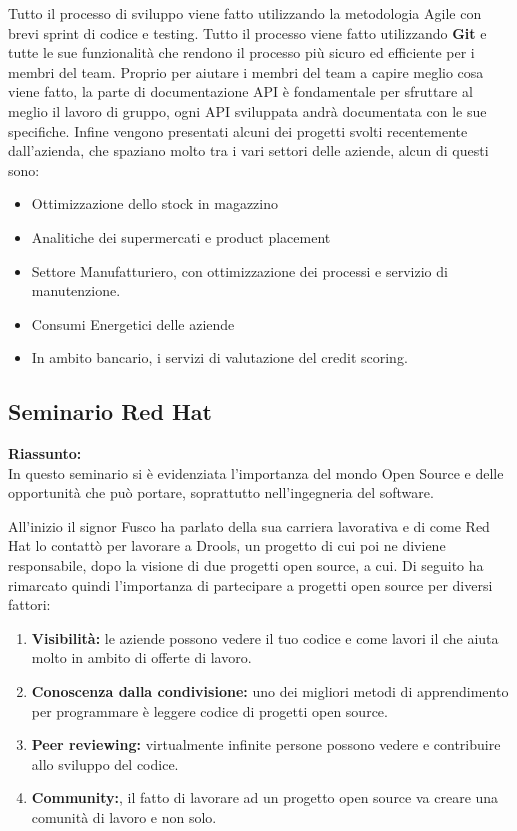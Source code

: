 \documentclass{article}
\begin{document}
Tutto il processo di sviluppo viene fatto utilizzando la metodologia Agile con brevi sprint di codice e testing.
Tutto il processo viene fatto utilizzando \textbf{Git} e tutte le sue funzionalità che rendono il processo più sicuro ed efficiente per i membri del team.
Proprio per aiutare i membri del team a capire meglio cosa viene fatto, la parte di documentazione API è fondamentale per sfruttare al meglio il lavoro di gruppo, ogni API sviluppata andrà documentata  con le sue specifiche.
Infine vengono presentati alcuni dei progetti svolti recentemente dall'azienda, che spaziano molto tra i vari settori delle aziende, alcun di questi sono:
\begin{itemize}
    \item Ottimizzazione dello stock in magazzino
    \item Analitiche dei supermercati e product placement
    \item Settore Manufatturiero, con ottimizzazione dei processi e servizio di manutenzione.
    \item Consumi Energetici delle aziende
    \item In ambito bancario, i servizi di valutazione del credit scoring.
\end{itemize}
\subsection{Seminario Red Hat}
\textbf{Riassunto:}
\\
In questo seminario si è evidenziata l'importanza del mondo Open Source e delle opportunità che può portare, soprattutto nell'ingegneria del software.

All'inizio il signor Fusco ha parlato della sua carriera lavorativa e di come Red Hat lo contattò per lavorare a Drools, un progetto di cui poi ne diviene responsabile, dopo la visione di due progetti open source, a cui.
Di seguito ha rimarcato quindi l'importanza di partecipare a progetti open source per diversi fattori:
\begin{enumerate}
    \item \textbf{Visibilità:} le aziende possono vedere il tuo codice e come lavori il che aiuta molto in ambito di offerte di lavoro.
    \item \textbf{Conoscenza dalla condivisione:} uno dei migliori metodi di apprendimento per programmare è leggere codice di progetti open source.
    \item \textbf{Peer reviewing:} virtualmente infinite persone possono vedere e contribuire allo sviluppo del codice.
    \item \textbf{Community:}, il fatto di lavorare ad un progetto open source va creare una comunità di lavoro e non solo.
\end{enumerate}
\end{document}
